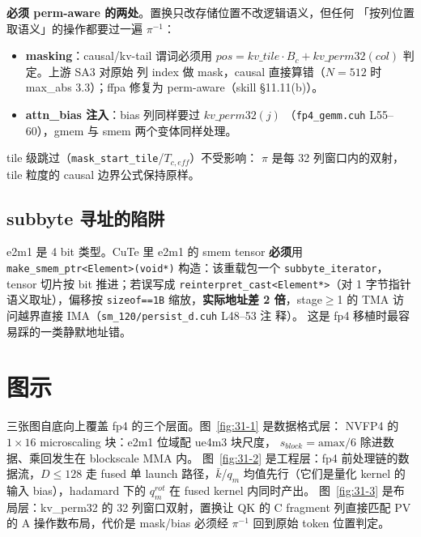 \textbf{必须 perm-aware 的两处}。置换只改存储位置不改逻辑语义，但任何
「按列位置取语义」的操作都要过一遍 $\pi^{-1}$：
\begin{itemize}[itemsep=0pt,topsep=2pt]
  \item \textbf{masking}：causal/kv-tail 谓词必须用
        $pos=kv\_tile\cdot B_c+kv\_perm32(col)$ 判定。上游 SA3 对原始
        列 index 做 mask，causal 直接算错（$N{=}512$ 时 max\_abs
        3.3）；ffpa 修复为 perm-aware（skill §11.11(b)）。
  \item \textbf{attn\_bias 注入}：bias 列同样要过 $kv\_perm32(j)$
        （\texttt{fp4\_gemm.cuh} L55--60），gmem 与 smem 两个变体同样处理。
\end{itemize}
tile 级跳过（\texttt{mask\_start\_tile}/$T_{c,eff}$）不受影响：
$\pi$ 是每 32 列窗口内的双射，tile 粒度的 causal 边界公式保持原样。

\subsection{subbyte 寻址的陷阱}

e2m1 是 4 bit 类型。CuTe 里 e2m1 的 smem tensor \textbf{必须}用
\texttt{make\_smem\_ptr<Element>(void*)} 构造：该重载包一个
\texttt{subbyte\_iterator}，tensor 切片按 bit 推进；若误写成
\texttt{reinterpret\_cast<Element*>}（对 1 字节指针语义取址），偏移按
\texttt{sizeof==1B} 缩放，\textbf{实际地址差 2 倍}，stage$\ge$1 的
TMA 访问越界直接 IMA（\texttt{sm\_120/persist\_d.cuh} L48--53 注
释）。
这是 fp4 移植时最容易踩的一类静默地址错。

\section{图示}

三张图自底向上覆盖 fp4 的三个层面。图~\ref{fig:31-1} 是数据格式层：
NVFP4 的 $1\times16$ microscaling 块：e2m1 位域配 ue4m3 块尺度，
$s_{block}=\mathrm{amax}/6$ 除进数据、乘回发生在 blockscale MMA 内。
图~\ref{fig:31-2} 是工程层：fp4 前处理链的数据流，$D\le128$ 走 fused
单 launch 路径，$\bar k$/$q_m$ 均值先行（它们是量化 kernel 的输入
bias），hadamard 下的 $q_m^{rot}$ 在 fused kernel 内同时产出。
图~\ref{fig:31-3} 是布局层：kv\_perm32 的 32 列窗口双射，置换让 QK 的
C fragment 列直接匹配 PV 的 A 操作数布局，代价是 mask/bias 必须经
$\pi^{-1}$ 回到原始 token 位置判定。

